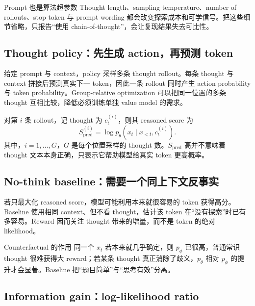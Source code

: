 \begin{warningbox}{Prompt 也是算法超参数}
Thought length、sampling temperature、number of rollouts、stop token 与 prompt wording 都会改变探索成本和可学信号。把这些细节省略，只报告“使用 chain-of-thought”，会让复现结果失去可比性。
\end{warningbox}

\subsection{Thought policy：先生成 action，再预测 token}

给定 prompt 与 context，policy 采样多条 thought rollout。每条 thought 与 context 拼接后预测真实下一 token，因此一条 rollout 同时产生 action probability 与 token probability。Group-relative optimization 可以把同一位置的多条 thought 互相比较，降低必须训练单独 value model 的需求。


对第 $i$ 条 rollout，记 thought 为 $c_t^{(i)}$，则其 reasoned score 为
\[
S_{\mathrm{pred}}^{(i)}
=\log p_\theta(x_t\mid x_{<t},c_t^{(i)}).
\]
其中，$i=1,\ldots,G$，$G$ 是每个位置采样的 thought 数。$S_{\mathrm{pred}}$ 高并不意味着 thought 文本本身正确，只表示它帮助模型给真实 token 更高概率。

\subsection{No-think baseline：需要一个同上下文反事实}

若只最大化 reasoned score，模型可能利用本来就很容易的 token 获得高分。Baseline 使用相同 context、但不看 thought，估计该 token 在“没有探索”时已有多容易。Reward 因而关注 thought 带来的增量，而不是 token 的绝对 likelihood。


\begin{importantbox}{Counterfactual 的作用}
同一个 $x_t$ 若本来就几乎确定，则 $p_\phi$ 已很高，普通常识 thought 很难获得大 reward；若某条 thought 真正消除了歧义，$p_\theta$ 相对 $p_\phi$ 的提升才会显著。Baseline 把“题目简单”与“思考有效”分离。
\end{importantbox}

\subsection{Information gain：log-likelihood ratio}

